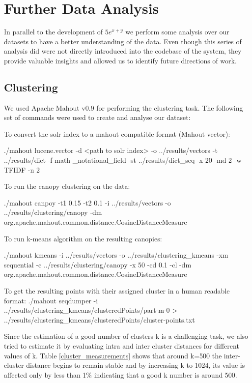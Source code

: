 \chapter{Further Data Analysis}
\label{chap-data_analysis}

In parallel to the development of $5e^{x+y}$ we perform some analysis over our datasets to have a better understanding of the data. Even though this series of analysis did were not directly introduced into the codebase of the system, they provide valuable insights and allowed us to identify future directions of work.

\section{Clustering}

We used Apache Mahout v0.9 for performing the clustering task. 
The following set of commands were used to create and analyse our dataset:

To convert the solr index to a mahout compatible format (Mahout vector):

\small{{\codefont ./mahout lucene.vector -d <path to solr index>  -o ../results/vectors -t ../results/dict -f math           \_notational\_field -st ../results/dict\_seq -x 20 -md 2 -w TFIDF -n 2}}

To run the canopy clustering on the data:

\small{{\codefont ./mahout canpoy -t1 0.15 -t2 0.1 -i ../results/vectors -o ../results/clustering/canopy -dm org.apache.mahout.common.distance.CosineDistanceMeasure}}

To run k-means algorithm on the resulting canopies:

\small{{\codefont ./mahout kmeans -i ../results/vectors -o ../results/clustering\_kmeans -xm sequential  -c ../results/clustering/canopy -x 50 -cd 0.1 -cl -dm org.apache.mahout.common.distance.CosineDistanceMeasure}}

To get the resulting points with their assigned cluster in a human readable format:
\small{{\codefont ./mahout seqdumper -i ../results/clustering\_kmeans/clusteredPoints/part-m-0 > ../results/clustering\_kmeans/clusteredPoints/cluster-points.txt}}

Since the estimation of a good number of clusters k is a challenging task, we also tried to estimate it  by evaluating intra and inter cluster distances for different values of k. Table \ref{cluster_measurements} shows that around k=500 the inter-cluster distance begins to remain stable and by increasing k to 1024, its value is affected only by less than 1\% indicating that a good k number is around 500.

